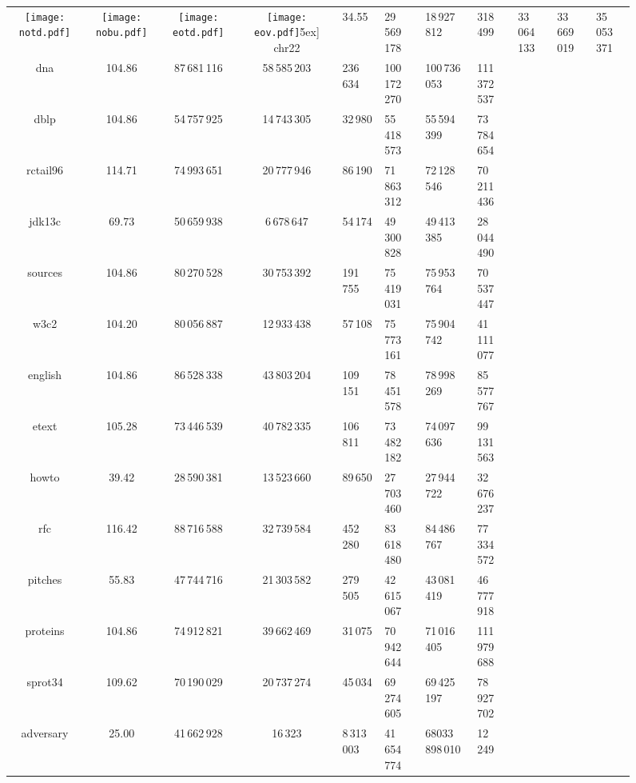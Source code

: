 \documentclass{llncs}
\newcommand\tstrut{\rule{0pt}{2.4ex}}
\begin{document}
\begin{figure}[t]
\begin{center}
\begin{tabular}{@{\hspace{0pt}}c@{\hspace{0pt}}c@{\hspace{0pt}}c@{\hspace{0pt}}c@{\hspace{0pt}}}
\texttt{[image: notd.pdf]}&
\texttt{[image: nobu.pdf]}&
\texttt{[image: eotd.pdf]}&
\texttt{[image: eov.pdf]}\.5ex] \hline
		chr22&	34.55&	29\,569\,178&	18\,927\,812&
                318\,499&	33\,064\,133&	33\,669\,019&	35\,053\,371 \tstrut \\
		dna&		104.86&	87\,681\,116&	58\,585\,203&	236\,634&	100\,172\,270&	100\,736\,053&	111\,372\,537 \\
		dblp&		104.86&	54\,757\,925&	14\,743\,305&	32\,980&	55\,418\,573&	55\,594\,399&	73\,784\,654 \\
		rctail96&	114.71&	74\,993\,651&	20\,777\,946&	86\,190&	71\,863\,312&	72\,128\,546&	70\,211\,436 \\
		jdk13c&	69.73&	50\,659\,938&	6\,678\,647&	54\,174&	49\,300\,828&	49\,413\,385&	28\,044\,490 \\
		sources&	104.86&	80\,270\,528&	30\,753\,392&	191\,755&	75\,419\,031&	75\,953\,764&	70\,537\,447 \\
		w3c2&		104.20&	80\,056\,887&	12\,933\,438&	57\,108&	75\,773\,161&	75\,904\,742&	41\,111\,077 \\
		english&	104.86&	86\,528\,338&	43\,803\,204&	109\,151&	78\,451\,578&	78\,998\,269&	85\,577\,767 \\
		etext&	105.28&	73\,446\,539&	40\,782\,335&	106\,811&	73\,482\,182&	74\,097\,636&	99\,131\,563 \\
		howto&	39.42&	28\,590\,381&	13\,523\,660&	89\,650&	27\,703\,460&	27\,944\,722&	32\,676\,237 \\
		rfc&		116.42&	88\,716\,588&	32\,739\,584&	452\,280&	83\,618\,480&	84\,486\,767&	77\,334\,572 \\
		pitches&	55.83&	47\,744\,716&	21\,303\,582&	279\,505&	42\,615\,067&	43\,081\,419&	46\,777\,918 \\
		proteins&	104.86&	74\,912\,821&	39\,662\,469&	31\,075&	70\,942\,644&	71\,016\,405&	111\,979\,688 \\
		sprot34&	109.62&	70\,190\,029&	20\,737\,274&	45\,034&	69\,274\,605&	69\,425\,197&	78\,927\,702 \\
		adversary&	25.00&	41\,662\,928&	16\,323&	8\,313\,003&	41\,654\,774&	68033\,898\,010&	12\,249 \\	
      \end{tabular}
      \end{center}


\end{figure}
\end{document}
